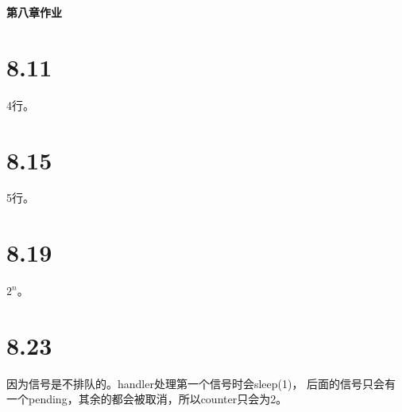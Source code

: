 \documentclass[11pt]{article}
\begin{document}
\begin{center}
  \textbf{\Huge{第八章作业}}
\end{center}

\section*{8.11}
4行。

\section*{8.15}
5行。

\section*{8.19}
$2^{n}$。

\section*{8.23}
因为信号是不排队的。handler处理第一个信号时会sleep(1)，
后面的信号只会有一个pending，其余的都会被取消，所以counter只会为2。
\end{document}
